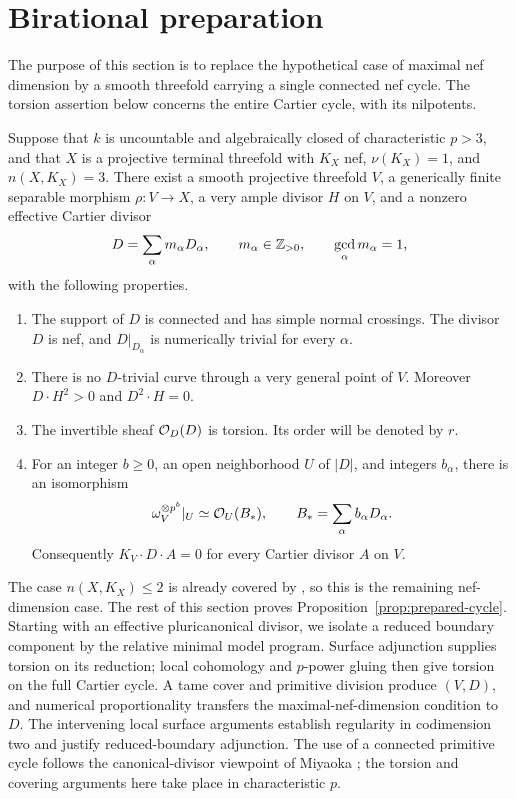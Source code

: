 \section{Birational preparation}
\label{sec:preparation}

The purpose of this section is to replace the hypothetical case of maximal
nef dimension by a smooth threefold carrying a single connected nef cycle.
The torsion assertion below concerns the entire Cartier cycle, with its
nilpotents.

\begin{proposition}
\label{prop:prepared-cycle}
Suppose that \(k\) is uncountable and algebraically closed of characteristic
\(p>3\), and that \(X\) is a projective terminal threefold with \(K_X\) nef,
\(\nu(K_X)=1\), and \(n(X,K_X)=3\).
There exist a smooth projective threefold \(V\), a generically finite
separable morphism \(\rho:V\to X\), a very ample divisor \(H\) on \(V\), and
a nonzero effective Cartier divisor
\[
 D=\sum_{\alpha}m_\alpha D_\alpha,\qquad
 m_\alpha\in\mathbb Z_{>0},\qquad \gcd_\alpha m_\alpha=1,
\]
with the following properties.
\begin{enumerate}[label=\textup{(\roman*)}]
\item The support of \(D\) is connected and has simple normal crossings.
The divisor \(D\) is nef, and \(D|_{D_\alpha}\) is numerically trivial
for every \(\alpha\).
\item There is no \(D\)-trivial curve through a very general point of \(V\).
Moreover \(D\cdot H^2>0\) and \(D^2\cdot H=0\).
\item The invertible sheaf \(\mathcal O_D(D)\) is torsion.  Its order will be denoted
by \(r\).
\item For an integer \(b\geq0\), an open neighborhood \(U\) of \(|D|\), and
integers \(b_\alpha\), there is an isomorphism
\begin{equation}
\label{eq:prepared-canonical}
 \omega_V^{\otimes p^b}|_U
 \simeq \mathcal O_U(B_*),\qquad B_*=\sum_\alpha b_\alpha D_\alpha .
\end{equation}
Consequently \(K_V\cdot D\cdot A=0\) for every Cartier divisor \(A\) on \(V\).
\end{enumerate}
\end{proposition}

The case $n(X,K_X)\leq2$ is already covered by
\cite[Theorem~1.8]{xu2024}, so this is the remaining nef-dimension case.
The rest of this section proves Proposition~\ref{prop:prepared-cycle}.
Starting with an effective pluricanonical divisor, we isolate a reduced
boundary component by the relative minimal model program.  Surface
adjunction supplies torsion on its reduction; local cohomology and
$p$-power gluing then give torsion on the full Cartier cycle.
A tame cover and primitive division produce $(V,D)$, and numerical
proportionality transfers the maximal-nef-dimension condition to $D$.
The intervening local surface arguments establish regularity in
codimension two and justify reduced-boundary adjunction.
The use of a connected primitive cycle follows the canonical-divisor
viewpoint of Miyaoka \cite[Definition~2.4 and Lemma~2.5]{miyaoka1988};
the torsion and covering arguments here take place in characteristic $p$.

